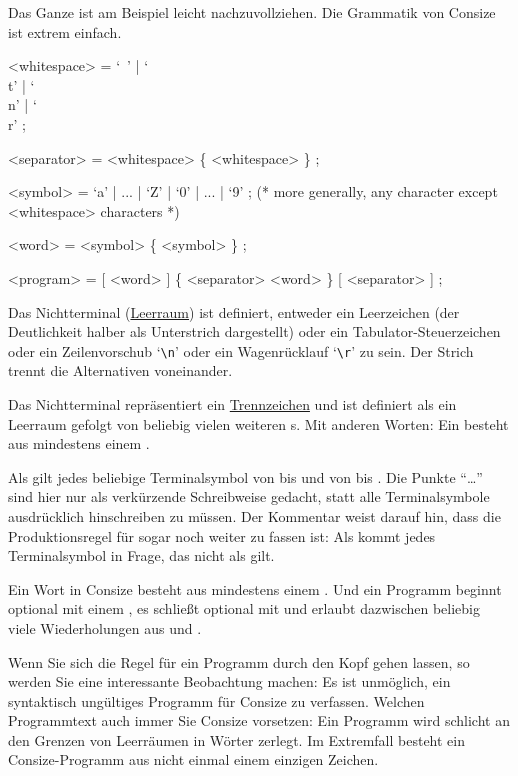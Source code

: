 Das Ganze ist am Beispiel leicht nachzuvollziehen. Die Grammatik von Consize ist extrem einfach.

\begin{grammar}
<whitespace> = `\ ' | `\\t' | `\\n' | `\\r' ;

<separator> = <whitespace> \{ <whitespace> \} ;

<symbol> = `a' | ... | `Z' | `0' | ... | `9'  ; (* more generally, any character except <whitespace> characters *)

<word> = <symbol> \{ <symbol> \} ;

<program> =  [ <word> ] \{ <separator> <word> \} [ <separator> ] ;
\end{grammar}

Das Nichtterminal  (\href{http://de.wikipedia.org/wiki/Leerraum}{Leerraum}) ist definiert, entweder ein Leerzeichen (der Deutlichkeit halber als Unterstrich dargestellt) oder ein Tabulator-Steuerzeichen oder ein Zeilenvorschub `\verb|\n|' oder ein Wagenrücklauf `\verb|\r|' zu sein. Der Strich trennt die Alternativen voneinander.

Das Nichtterminal  repräsentiert ein \href{http://de.wikipedia.org/wiki/Trennzeichen}{Trennzeichen} und ist definiert als ein Leerraum  gefolgt von beliebig vielen weiteren s. Mit anderen Worten: Ein  besteht aus mindestens einem .

Als  gilt jedes beliebige Terminalsymbol von  bis  und von  bis . Die Punkte "`\dots"' sind hier nur als verkürzende Schreibweise gedacht, statt alle Terminalsymbole ausdrücklich hinschreiben zu müssen. Der Kommentar weist darauf hin, dass die Produktionsregel für  sogar noch weiter zu fassen ist: Als  kommt jedes Terminalsymbol in Frage, das nicht als  gilt.

Ein Wort  in Consize besteht aus mindestens einem . Und ein Programm  beginnt optional mit einem , es schließt optional mit  und erlaubt dazwischen beliebig viele Wiederholungen aus  und .

Wenn Sie sich die Regel für ein Programm  durch den Kopf gehen lassen, so werden Sie eine interessante Beobachtung machen: Es ist unmöglich, ein syntaktisch ungültiges Programm für Consize zu verfassen. Welchen Programmtext auch immer Sie Consize vorsetzen: Ein Programm wird schlicht an den Grenzen von Leerräumen in Wörter zerlegt. Im Extremfall besteht ein Consize-Programm aus nicht einmal einem einzigen Zeichen.

